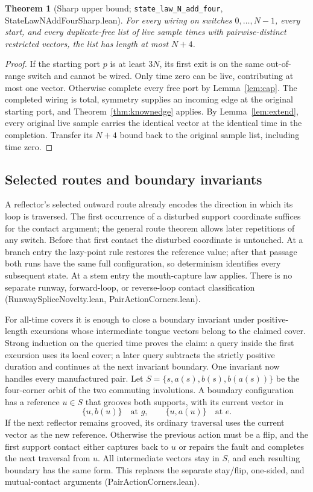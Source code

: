 \documentclass[11pt]{article}
\newtheorem{theorem}{Theorem}[section]
\theoremstyle{definition}
\newcommand{\lean}[1]{\texttt{#1}}
\newcommand{\file}[1]{\textsf{#1}}
\begin{document}
\begin{theorem}[Sharp upper bound; \lean{state\_law\_N\_add\_four},
  \file{StateLawNAddFourSharp.lean}]
  \label{thm:upper}
  For every wiring on switches $0,\dots,N-1$, every start, and every
  duplicate-free list of live sample times with pairwise-distinct
  restricted vectors, the list has length at most $N+4$.
\end{theorem}

\begin{proof}
  If the starting port $p$ is at least $3N$, its first exit is on the same
  out-of-range switch and cannot be wired. Only time zero can be live,
  contributing at most one vector. Otherwise complete every free port by
  Lemma~\ref{lem:cap}. The completed wiring is total, symmetry supplies an
  incoming edge at the original starting port, and
  Theorem~\ref{thm:knownedge} applies. By Lemma~\ref{lem:extend}, every
  original live sample carries the identical vector at the identical
  time in the completion. Transfer its $N+4$ bound back to the original
  sample list, including time zero.
\end{proof}

\subsection{Selected routes and boundary invariants}

A reflector's selected outward route already encodes the direction in
which its loop is traversed. The first occurrence of a disturbed support coordinate suffices for the
contact argument; the general route theorem allows later repetitions of any
switch. Before that first contact the disturbed coordinate is untouched. At a branch entry the lazy-point rule restores the reference
value; after that passage both runs have the same full configuration,
so determinism identifies every subsequent state. At a stem entry the
mouth-capture law applies. There is no separate runway, forward-loop,
or reverse-loop contact classification
(\file{RunwaySpliceNovelty.lean}, \file{PairActionCorners.lean}).

For all-time covers it is enough to close a boundary invariant under
positive-length excursions whose intermediate tongue vectors belong to
the claimed cover. Strong induction on the queried time proves the
claim: a query inside the first excursion uses its local cover; a later
query subtracts the strictly positive duration and continues at the next
invariant boundary. One invariant now handles every manufactured pair.
Let $S=\{s,a(s),b(s),b(a(s))\}$ be the four-corner orbit of the two
commuting involutions. A boundary configuration has a reference $u\in S$
that grooves both supports, with its current vector in
\[
 \{u,b(u)\}\quad\text{at }g,\qquad
 \{u,a(u)\}\quad\text{at }e.
\]
If the next reflector remains grooved, its ordinary traversal uses the
current vector as the new reference. Otherwise the previous action must
be a flip, and the first support contact either captures back to $u$ or
repairs the fault and completes the next traversal from $u$. All intermediate
vectors stay in $S$, and each resulting boundary has the same form. This
replaces the separate stay/flip, one-sided, and mutual-contact arguments
(\file{PairActionCorners.lean}).
\end{document}
